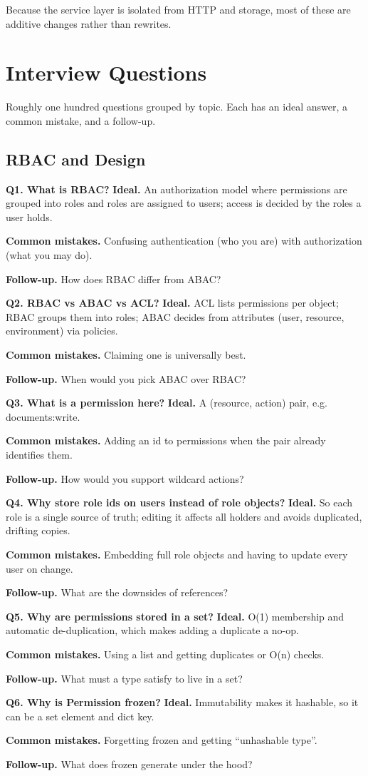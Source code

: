 \documentclass[11pt,a4paper]{report}
\newcommand{\qa}[3]{%
  \textbf{Ideal.} #1\par
  \textbf{Common mistakes.} #2\par
  \textbf{Follow-up.} #3\par
  \vspace{4pt}
}
\begin{document}
Because the service layer is isolated from HTTP and storage, most of these are
additive changes rather than rewrites.

\chapter{Interview Questions}

Roughly one hundred questions grouped by topic. Each has an ideal answer, a
common mistake, and a follow-up.

\section{RBAC and Design}

\textbf{Q1. What is RBAC?}
\qa{An authorization model where permissions are grouped into roles and roles are
assigned to users; access is decided by the roles a user holds.}
{Confusing authentication (who you are) with authorization (what you may do).}
{How does RBAC differ from ABAC?}

\textbf{Q2. RBAC vs ABAC vs ACL?}
\qa{ACL lists permissions per object; RBAC groups them into roles; ABAC decides
from attributes (user, resource, environment) via policies.}
{Claiming one is universally best.}
{When would you pick ABAC over RBAC?}

\textbf{Q3. What is a permission here?}
\qa{A (resource, action) pair, e.g. documents:write.}
{Adding an id to permissions when the pair already identifies them.}
{How would you support wildcard actions?}

\textbf{Q4. Why store role ids on users instead of role objects?}
\qa{So each role is a single source of truth; editing it affects all holders and
avoids duplicated, drifting copies.}
{Embedding full role objects and having to update every user on change.}
{What are the downsides of references?}

\textbf{Q5. Why are permissions stored in a set?}
\qa{O(1) membership and automatic de-duplication, which makes adding a duplicate a
no-op.}
{Using a list and getting duplicates or O(n) checks.}
{What must a type satisfy to live in a set?}

\textbf{Q6. Why is Permission frozen?}
\qa{Immutability makes it hashable, so it can be a set element and dict key.}
{Forgetting frozen and getting ``unhashable type''.}
{What does frozen generate under the hood?}
\end{document}
